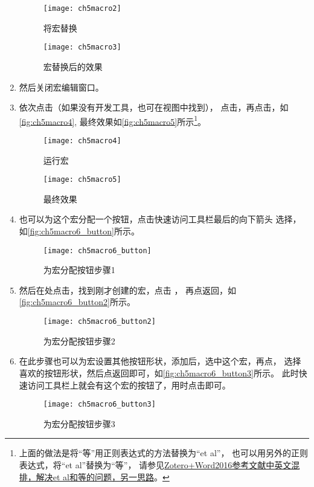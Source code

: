 \documentclass[cn,11pt,chinese]{elegantbook}
\begin{document}
\begin{enumerate}
			\begin{figure}[htbp]
				\centering
				\texttt{[image: ch5macro2]}
				\caption{将宏替换}
				\label{fig:ch5macro2}
			\end{figure}
			\begin{figure}[htbp]
				\centering
				\texttt{[image: ch5macro3]}
				\caption{宏替换后的效果}
				\label{fig:ch5macro3}
			\end{figure}
		\item 然后关闭宏编辑窗口。
		\item 依次点击（如果没有开发工具，也可在视图中找到），
		点击，再点击，如\autoref{fig:ch5macro4},
		最终效果如\autoref{fig:ch5macro5}所示\footnote{
			上面的做法是将“等”用正则表达式的方法替换为“et al”，
						也可以用另外的正则表达式，将“et al”替换为“等”，
						请参见\href{https://zhuanlan.zhihu.com/p/60029219}
						{Zotero+Word2016参考文献中英文混排，解决et al和等的问题，另一思路}。
		}。
			\begin{figure}[htbp]
				\centering
				\texttt{[image: ch5macro4]}
				\caption{运行宏}
				\label{fig:ch5macro4}
			\end{figure}
			\begin{figure}[htbp]
				\centering
				\texttt{[image: ch5macro5]}
				\caption{最终效果}
				\label{fig:ch5macro5}
			\end{figure}
		\item 也可以为这个宏分配一个按钮，点击快速访问工具栏最后的向下箭头
		选择，如\autoref{fig:ch5macro6_button}所示。	
				\begin{figure}[htbp]
					\centering
					\texttt{[image: ch5macro6\_button]}
					\caption{为宏分配按钮步骤1}
					\label{fig:ch5macro6_button}
				\end{figure}
		\item 然后在处点击，找到刚才创建的宏，点击
		，
		再点返回，如\autoref{fig:ch5macro6_button2}所示。		
				\begin{figure}[htbp]
					\centering
					\texttt{[image: ch5macro6\_button2]}
					\caption{为宏分配按钮步骤2}
					\label{fig:ch5macro6_button2}
				\end{figure}
		\item 在此步骤也可以为宏设置其他按钮形状，添加后，选中这个宏，再点，
		选择喜欢的按钮形状，然后点返回即可，如\autoref{fig:ch5macro6_button3}所示。
		此时快速访问工具栏上就会有这个宏的按钮了，用时点击即可。	
			\begin{figure}[htbp]
				\centering
				\texttt{[image: ch5macro6\_button3]}
				\caption{为宏分配按钮步骤3}
				\label{fig:ch5macro6_button3}
			\end{figure}
		\end{enumerate}
			
\end{document}
